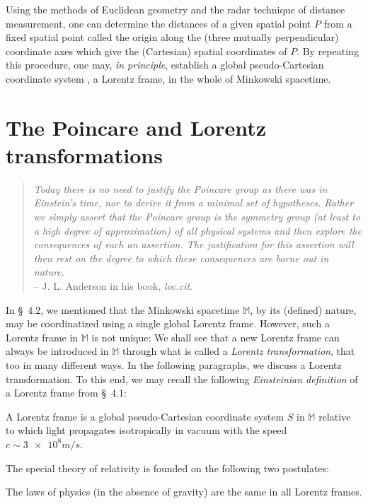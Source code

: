 \begin{small}
Using the methods of Euclidean geometry and the radar 
technique of distance measurement, one can determine the 
distances of a given spatial point $P$ from a fixed spatial 
point called the origin along the (three mutually 
perpendicular) coordinate axes which give the (Cartesian) 
spatial coordinates of $P$. By repeating this procedure, 
one 
may, \textsl{in principle}, establish a global 
pseudo-Cartesian coordinate system \ie, a Lorentz frame, in 
the whole of Minkowski spacetime.

\section{The Poincare and Lorentz\\ transformations}
\begin{quote}
\textsl{Today there is no need to justify the Poincare 
group 
as there was in Einstein's time, nor to derive it from a 
minimal set of hypotheses. Rather we  simply assert that 
the 
Poincare group is the symmetry group (at least to a high 
degree of approximation) of all physical systems and then 
explore the consequences of such an assertion. The 
justification for this assertion will then rest on the 
degree to which these consequences are borne out in 
nature.}\\ 
\dm \hfill -- J. L. Anderson in his book, \textsl{loc.cit}.
\end{quote}  

In \S~4.2, we mentioned that the Minkowski spacetime 
$\mathbb{M}$, by its (defined) nature, may be coordinatized 
using a single global Lorentz frame. However, such a 
Lorentz frame in $\mathbb{M}$ is not unique: We shall see 
that a new Lorentz frame can always be introduced in 
$\mathbb{M}$ through what is called a  \textsl{Lorentz 
transformation},  that too in many different ways. In the 
following paragraphs, we discuss a Lorentz transformation. 
To this end, we may recall the following 
\textsl{Einsteinian 
definition} of a Lorentz frame from \S~4.1: 

\dfn A Lorentz frame is a global pseudo-Cartesian 
coordinate system $S$ in $\mathbb{M}$ relative to which 
light propagates isotropically in vacuum  with the speed 
$c\sim \num{3e8}\si{m/s}$. 

The special theory of relativity is founded on the 
following 
two postulates: 

 The laws of physics (in 
the absence of gravity) are the same in all Lorentz frames. 


\end{small}
